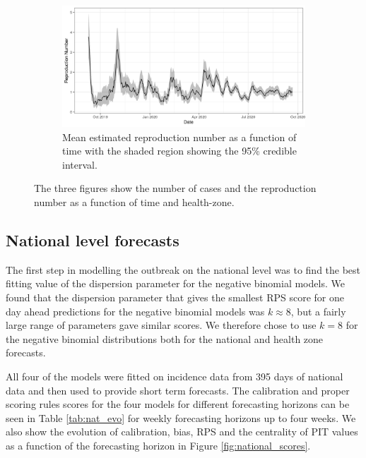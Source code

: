 \documentclass[12pt]{article}
\begin{document}
\begin{figure}[h!]
\bigskip

\begin{subfigure}{\textwidth}
  \centering
  \includegraphics[width=\textwidth]{../output/nat_Rs.png}
  \caption{Mean estimated reproduction number as a function of time with the shaded region showing the 95\% credible interval.}
  \label{fig:rep_num}
\end{subfigure}
\caption{The three figures show the number of cases and the reproduction number as a function of time and health-zone.}
\label{fig:nat_outbreak}
\end{figure}

\subsection{National level forecasts}
The first step in modelling the outbreak on the national level was to find the best fitting value of the dispersion parameter for the negative binomial models. We found that the dispersion parameter that gives the smallest RPS score for one day ahead predictions for the negative binomial models was $k\approx8$, but a fairly large range of parameters gave similar scores. We therefore chose to use $k=8$ for the negative binomial distributions both for the national and health zone forecasts.

All four of the models were fitted on incidence data from 395 days of national data and then used to provide short term forecasts. The calibration and proper scoring rules scores for the four models for different forecasting horizons can be seen in Table \ref{tab:nat_evo} for weekly forecasting horizons up to four weeks. We also show the evolution of calibration, bias, RPS and the centrality of PIT values as a function of the forecasting horizon in Figure \ref{fig:national_scores}.

\end{document}
